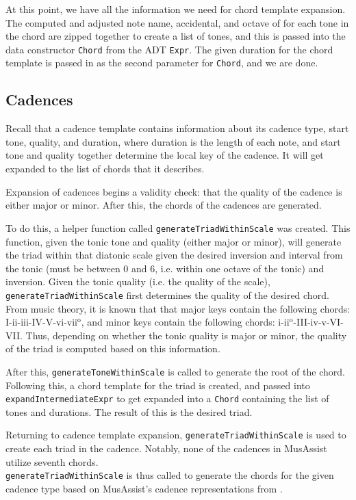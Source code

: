\documentclass{report}
\begin{document}
At this point,  we have all the information we need for chord template expansion. The computed and adjusted note name, accidental, and octave of for each tone in the chord are zipped together to create a list of  tones, and this is passed into the data constructor \verb.Chord. from the ADT \verb.Expr.. The given duration  for the chord template is passed in as the second parameter for \verb.Chord., and we are done.


\subsection{Cadences}
Recall that a cadence template contains information about its cadence type, start tone, quality, and duration, where duration is the length of each note, and start tone and quality together determine the local key of the cadence. It will get expanded to the list of chords that it describes.

Expansion of cadences begins a validity check: that the quality of the cadence is either major or minor. After this, the chords of the cadences are generated.

To do this, a helper function called \verb.generateTriadWithinScale. was created. This function, given the tonic tone and quality (either major or minor), will generate the triad within that diatonic scale given the desired inversion and interval from the tonic (must be between 0 and 6, i.e. within one octave of the tonic) and inversion. Given the tonic quality (i.e. the quality of the scale), \verb.generateTriadWithinScale. first determines the quality of the desired chord. From music theory, it is known that that major keys contain the following chords: I-ii-iii-IV-V-vi-vii$^\text{o}$, and minor keys contain the following chords: i-ii$^\text{o}$-III-iv-v-VI-VII. Thus, depending on whether the tonic quality is major or minor, the quality of the triad is computed based on this information.

After this, \verb.generateToneWithinScale. is called to  generate the root of the chord. Following this, a chord template for the triad is created, and passed into \verb.expandIntermediateExpr. to get expanded into a \verb.Chord. containing the list of tones and durations. The result of this is the desired triad.

Returning to cadence template expansion, \verb.generateTriadWithinScale. is used to create each triad in  the cadence. Notably, none of the cadences in MusAssist utilize seventh chords. 
\\\verb.generateTriadWithinScale. is thus called to generate the chords for the given cadence type based on MusAssist's cadence representations from . 
\end{document}
